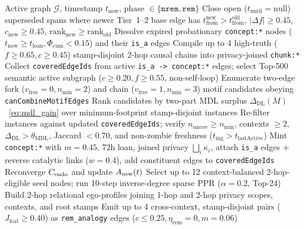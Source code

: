 \begin{algorithm}[H]
\caption{Dual-Phase Zero-LLM Sleep: NREM MDL Concept Genesis \& REM Structural Analogy (Law~4)}
\label{alg:sleep}
\begin{algorithmic}[1]
\Require Active graph $\mathcal{G}$, timestamp $t_{\mathrm{now}}$, phase $\in \{\texttt{nrem}, \texttt{rem}\}$
  \State Close open ($t_{\mathrm{until}}=\mathrm{null}$) superseded spans where newer Tier~1--2 base edge has $t_{\mathrm{from}}^{\mathrm{new}} > t_{\mathrm{from}}^{\mathrm{old}}$, $|\Delta f| \ge 0.45$, $c_{\mathrm{new}} \ge 0.45$, $\mathrm{rank}_{\mathrm{new}} \ge \mathrm{rank}_{\mathrm{old}}$
  \State Dissolve expired probationary \texttt{concept:*} nodes ($t_{\mathrm{now}} \ge t_{\mathrm{loan}}, \Phi_{\mathrm{cum}} < 0.15$) and their \texttt{is\_a} edges
  \State Compile up to 4 high-truth ($f \ge 0.65, c \ge 0.45$) stamp-disjoint 2-hop causal chains into privacy-joined \texttt{chunk:*}
  \State Collect \texttt{coveredEdgeIds} from active \texttt{is\_a -> concept:*} edges; select Top-500 semantic active subgraph ($c \ge 0.20, f \ge 0.55$, non-self-loop)
  \State Enumerate two-edge fork ($v_{\mathrm{free}}=0, n_{\min}=2$) and chain ($v_{\mathrm{free}}=1, n_{\min}=3$) motif candidates obeying \texttt{canCombineMotifEdges}
  \State Rank candidates by two-part MDL surplus $\Delta_{\mathrm{DL}}(M)$~\eqref{eq:mdl_gain} over minimum-footprint stamp-disjoint instances
    \State Re-filter instances against updated \texttt{coveredEdgeIds}; verify $n_{\mathrm{uncov}} \ge n_{\min}$, contexts $\ge 2$, $\Delta_{\mathrm{DL}} > \theta_{\mathrm{MDL}}$, Jaccard $< 0.70$, and non-zombie freshness ($t_{\mathrm{ing}} > t_{\mathrm{lastActive}}$)
    \State Mint \texttt{concept:*} with $m = 0.45$, 72h loan, joined privacy $\bigsqcup_i \kappa_i$, attach \texttt{is\_a} edges + reverse catalytic links ($w = 0.4$), add constituent edges to \texttt{coveredEdgeIds}
  \EndFor
  \State Reconverge $C_{\mathrm{endo}}$ and update $A_{\mathrm{new}}(t)$
\Else {}
  \State Select up to 12 context-balanced 2-hop-eligible seed nodes; run 10-step inverse-degree sparse PPR ($\alpha=0.2$, Top-24)
  \State Build 2-hop relational ego-profiles joining 1-hop and 2-hop privacy scopes, contexts, and root stamps
  \State Emit up to 4 cross-context, stamp-disjoint pairs ($J_{\mathrm{feat}} \ge 0.40$) as \texttt{rem\_analogy} edges ($c \le 0.25, \eta_{\mathrm{rem}}=0, m=0.06$)
\EndIf
\end{algorithmic}
\end{algorithm}

